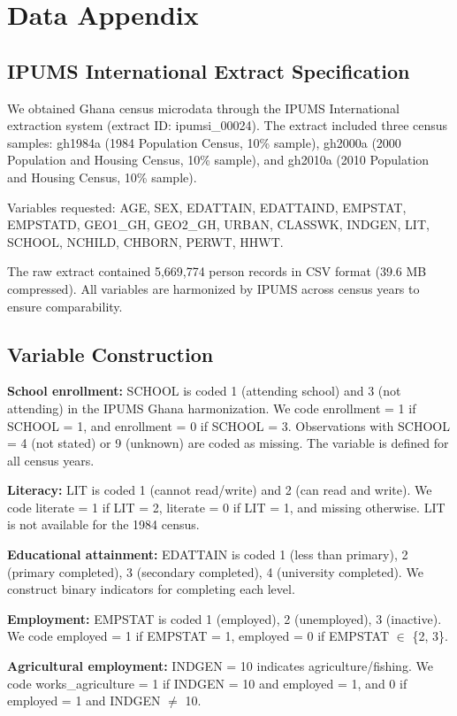 \documentclass[12pt]{article}
\begin{document}
\section{Data Appendix}

\subsection{IPUMS International Extract Specification}

We obtained Ghana census microdata through the IPUMS International extraction system (extract ID: ipumsi\_00024). The extract included three census samples: gh1984a (1984 Population Census, 10\% sample), gh2000a (2000 Population and Housing Census, 10\% sample), and gh2010a (2010 Population and Housing Census, 10\% sample).

Variables requested: AGE, SEX, EDATTAIN, EDATTAIND, EMPSTAT, EMPSTATD, GEO1\_GH, GEO2\_GH, URBAN, CLASSWK, INDGEN, LIT, SCHOOL, NCHILD, CHBORN, PERWT, HHWT.

The raw extract contained 5,669,774 person records in CSV format (39.6 MB compressed). All variables are harmonized by IPUMS across census years to ensure comparability.

\subsection{Variable Construction}

\textbf{School enrollment:} SCHOOL is coded 1 (attending school) and 3 (not attending) in the IPUMS Ghana harmonization. We code enrollment = 1 if SCHOOL = 1, and enrollment = 0 if SCHOOL = 3. Observations with SCHOOL = 4 (not stated) or 9 (unknown) are coded as missing. The variable is defined for all census years.

\textbf{Literacy:} LIT is coded 1 (cannot read/write) and 2 (can read and write). We code literate = 1 if LIT = 2, literate = 0 if LIT = 1, and missing otherwise. LIT is not available for the 1984 census.

\textbf{Educational attainment:} EDATTAIN is coded 1 (less than primary), 2 (primary completed), 3 (secondary completed), 4 (university completed). We construct binary indicators for completing each level.

\textbf{Employment:} EMPSTAT is coded 1 (employed), 2 (unemployed), 3 (inactive). We code employed = 1 if EMPSTAT = 1, employed = 0 if EMPSTAT $\in$ \{2, 3\}.

\textbf{Agricultural employment:} INDGEN = 10 indicates agriculture/fishing. We code works\_agriculture = 1 if INDGEN = 10 and employed = 1, and 0 if employed = 1 and INDGEN $\neq$ 10.
\end{document}
